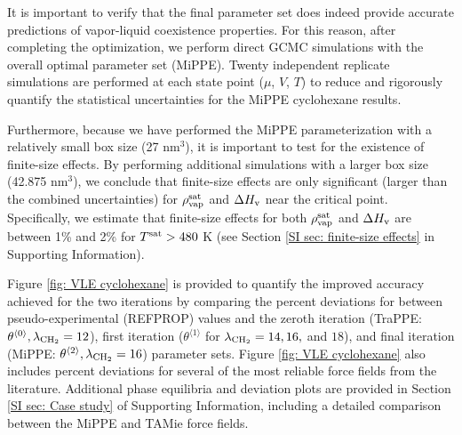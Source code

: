 \documentclass[journal=jced,manuscript=article]{achemso}
\begin{document}

It is important to verify that the final parameter set does indeed provide accurate predictions of vapor-liquid coexistence properties. For this reason, after completing the optimization, we perform direct GCMC simulations with the overall optimal parameter set (MiPPE). Twenty independent replicate simulations are performed at each state point ($\mu$, $V$, $T$) to reduce and rigorously quantify the statistical uncertainties for the MiPPE cyclohexane results.

Furthermore, because we have performed the MiPPE parameterization with a relatively small box size (27 nm$^3$), it is important to test for the existence of finite-size effects. By performing additional simulations with a larger box size (42.875 nm$^3$), we conclude that finite-size effects are only significant (larger than the combined uncertainties) for $\rho_{\rm vap}^{\rm sat}$ and $\Delta H_{\rm v}$ near the critical point. Specifically, we estimate that finite-size effects for both $\rho_{\rm vap}^{\rm sat}$ and $\Delta H_{\rm v}$ are between 1\% and 2\% for $T^{\rm sat} > 480$ K (see Section \ref{SI sec: finite-size effects} in Supporting Information).
 
Figure \ref{fig: VLE cyclohexane} is provided to quantify the improved accuracy achieved for the two iterations by comparing the percent deviations for between pseudo-experimental (REFPROP) values and the zeroth iteration (TraPPE: $\theta^{\langle0\rangle}, \lambda_{\rm CH_2} = 12$), first iteration ($\theta^{\langle1\rangle}$ for $\lambda_{\rm CH_2} = 14, 16,$ and $18$), and final iteration (MiPPE: $\theta^{\langle2\rangle}, \lambda_{\rm CH_2} = 16$) parameter sets. Figure \ref{fig: VLE cyclohexane} also includes percent deviations for several of the most reliable force fields from the literature.\cite{Errington1999,Eckl2008,Bourasseau2002CYC6,Mauricio2015,Keasler2012,Yiannourakou2019,Weidler2016} Additional phase equilibria and deviation plots are provided in Section \ref{SI sec: Case study} of Supporting Information, including a detailed comparison between the MiPPE and TAMie force fields.

\end{document}
